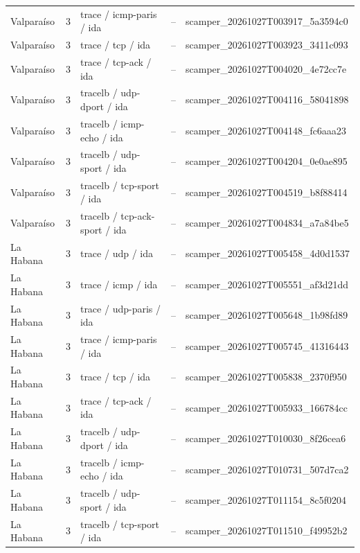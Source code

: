 \begin{longtable}{p{2cm}p{1.15cm}p{4.2cm}p{2.2cm}p{4.95cm}}
Valparaíso & 3 & trace / icmp-paris / ida & -- & scamper\_\allowbreak{}20261027T003917\_\allowbreak{}5a3594c0 \\
Valparaíso & 3 & trace / tcp / ida & -- & scamper\_\allowbreak{}20261027T003923\_\allowbreak{}3411c093 \\
Valparaíso & 3 & trace / tcp-ack / ida & -- & scamper\_\allowbreak{}20261027T004020\_\allowbreak{}4e72cc7e \\
Valparaíso & 3 & tracelb / udp-dport / ida & -- & scamper\_\allowbreak{}20261027T004116\_\allowbreak{}58041898 \\
Valparaíso & 3 & tracelb / icmp-echo / ida & -- & scamper\_\allowbreak{}20261027T004148\_\allowbreak{}fc6aaa23 \\
Valparaíso & 3 & tracelb / udp-sport / ida & -- & scamper\_\allowbreak{}20261027T004204\_\allowbreak{}0e0ae895 \\
Valparaíso & 3 & tracelb / tcp-sport / ida & -- & scamper\_\allowbreak{}20261027T004519\_\allowbreak{}b8f88414 \\
Valparaíso & 3 & tracelb / tcp-ack-sport / ida & -- & scamper\_\allowbreak{}20261027T004834\_\allowbreak{}a7a84be5 \\
La Habana & 3 & trace / udp / ida & -- & scamper\_\allowbreak{}20261027T005458\_\allowbreak{}4d0d1537 \\
La Habana & 3 & trace / icmp / ida & -- & scamper\_\allowbreak{}20261027T005551\_\allowbreak{}af3d21dd \\
La Habana & 3 & trace / udp-paris / ida & -- & scamper\_\allowbreak{}20261027T005648\_\allowbreak{}1b98fd89 \\
La Habana & 3 & trace / icmp-paris / ida & -- & scamper\_\allowbreak{}20261027T005745\_\allowbreak{}41316443 \\
La Habana & 3 & trace / tcp / ida & -- & scamper\_\allowbreak{}20261027T005838\_\allowbreak{}2370f950 \\
La Habana & 3 & trace / tcp-ack / ida & -- & scamper\_\allowbreak{}20261027T005933\_\allowbreak{}166784cc \\
La Habana & 3 & tracelb / udp-dport / ida & -- & scamper\_\allowbreak{}20261027T010030\_\allowbreak{}8f26cea6 \\
La Habana & 3 & tracelb / icmp-echo / ida & -- & scamper\_\allowbreak{}20261027T010731\_\allowbreak{}507d7ca2 \\
La Habana & 3 & tracelb / udp-sport / ida & -- & scamper\_\allowbreak{}20261027T011154\_\allowbreak{}8c5f0204 \\
La Habana & 3 & tracelb / tcp-sport / ida & -- & scamper\_\allowbreak{}20261027T011510\_\allowbreak{}f49952b2 \\

\end{longtable}
